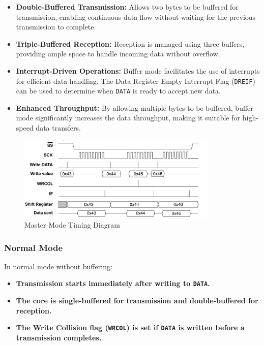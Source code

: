 \begin{itemize}
    \item \textbf{Double-Buffered Transmission:} Allows two bytes to be buffered for transmission, enabling continuous data flow without waiting for the previous transmission to complete.
    \item \textbf{Triple-Buffered Reception:} Reception is managed using three buffers, providing ample space to handle incoming data without overflow.
    \item \textbf{Interrupt-Driven Operations:} Buffer mode facilitates the use of interrupts for efficient data handling. The Data Register Empty Interrupt Flag (\texttt{DREIF}) can be used to determine when \texttt{DATA} is ready to accept new data.
    \item \textbf{Enhanced Throughput:} By allowing multiple bytes to be buffered, buffer mode significantly increases the data throughput, making it suitable for high-speed data transfers.
\end{itemize}

\begin{figure}[H]
    \centering
    \includegraphics[width=0.85\textwidth]{images/spi_master_timing.png}
    \caption{Master Mode Timing Diagram}
    \label{fig:spi_master_timing}
\end{figure}

\subsubsection{Normal Mode}
In normal mode without buffering:

\begin{itemize}
    \item \textbf{Transmission starts immediately after writing to \texttt{DATA}.}
    \item \textbf{The core is single-buffered for transmission and double-buffered for reception.}
    \item \textbf{The Write Collision flag (\texttt{WRCOL}) is set if \texttt{DATA} is written before a transmission completes.}
\end{itemize}

